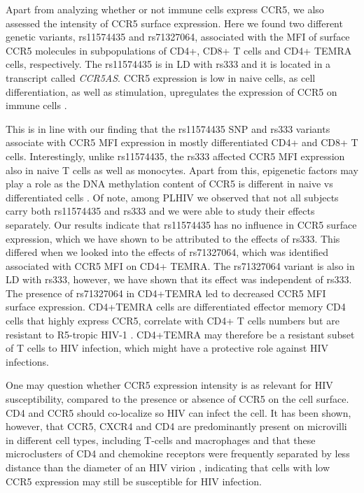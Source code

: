 \documentclass{book}
\begin{document}
\begin{refsection}
Apart from analyzing whether or not immune cells express CCR5, we also assessed the intensity of CCR5 surface expression.
Here we found two different genetic variants, rs11574435 and rs71327064, associated with the MFI of surface CCR5 molecules in subpopulations of CD4+, CD8+ T cells and CD4+ TEMRA cells, respectively.
The rs11574435 is in LD with rs333 and it is located in a transcript called \textit{CCR5AS}.
CCR5 expression is low in naive cells, as cell differentiation, as well as stimulation, upregulates the expression of CCR5 on immune cells \cite{Lee1999Quantification,Carroll1998The}.

This is in line with our finding that the rs11574435 SNP and rs333 variants associate with CCR5 MFI expression in mostly differentiated CD4+ and CD8+ T cells.
Interestingly, unlike rs11574435, the rs333 affected CCR5 MFI expression also in naive T cells as well as monocytes.
Apart from this, epigenetic factors may play a role as the DNA methylation content of CCR5 is different in naive vs differentiated cells  \cite{Gornalusse2015Epigenetic}.
Of note, among PLHIV we observed that not all subjects carry both rs11574435 and rs333 and we were able to study their effects separately.
Our results indicate that rs11574435 has no influence in CCR5 surface expression, which we have shown to be attributed to the effects of rs333.
This differed when we looked into the effects of rs71327064, which was identified associated with CCR5 MFI on CD4+ TEMRA.
The rs71327064 variant is also in LD with rs333, however, we have shown that its effect was independent of rs333.
The presence of rs71327064 in CD4+TEMRA led to decreased CCR5 MFI surface expression.
CD4+TEMRA cells are differentiated effector memory CD4 cells that highly express CCR5, correlate with CD4+ T cells numbers but are resistant to R5-tropic HIV-1 \cite{Oswald2007Identification}.
CD4+TEMRA may therefore be a resistant subset of T cells to HIV infection, which might have a protective role against HIV infections.  

One may question whether CCR5 expression intensity is as relevant for HIV susceptibility, compared to the presence or absence of CCR5 on the cell surface.
CD4 and CCR5 should co-localize so HIV can infect the cell.
It has been shown, however, that CCR5, CXCR4 and CD4 are predominantly present on microvilli in different cell types, including T-cells and macrophages and that these microclusters of CD4 and chemokine receptors were frequently separated by less distance than the diameter of an HIV virion \cite{Singer2001CCR5}, indicating that cells with low CCR5 expression may still be susceptible for HIV infection.


\end{refsection}
\end{document}
